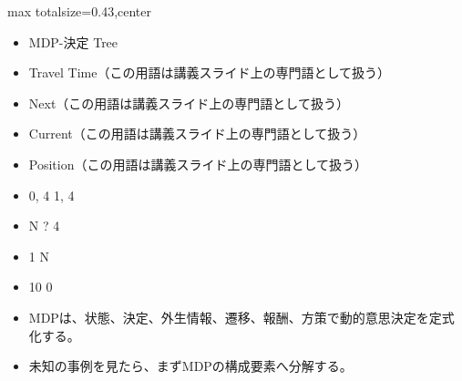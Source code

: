 \clearpage
{}
\begin{minipage}[t]{0.405\textwidth}
\begin{adjustbox}{max totalsize={\textwidth}{0.43\textheight},center}
\begin{minipage}{\textwidth}\scriptsize
{}\begin{itemize}
\item MDP-決定 Tree
\item Travel Time（この用語は講義スライド上の専門語として扱う）
\item Next（この用語は講義スライド上の専門語として扱う）
\item Current（この用語は講義スライド上の専門語として扱う）
\item Position（この用語は講義スライド上の専門語として扱う）
\item 0, 4 1, 4
\item N ? 4
\item 1 N
\item 10 0
\end{itemize}\begin{itemize}
\item MDPは、状態、決定、外生情報、遷移、報酬、方策で動的意思決定を定式化する。
\item 未知の事例を見たら、まずMDPの構成要素へ分解する。
\end{itemize}
\end{minipage}
\end{adjustbox}
\end{minipage}\hfill
